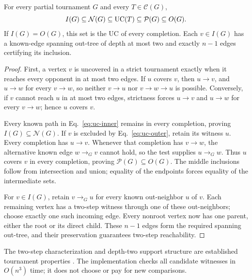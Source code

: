 \begin{proposition}\label{prop:uc-completion-enclosure}
For every partial tournament $G$ and every $T\in\mathcal C(G)$,
\[
I(G)\subseteq\mathcal N(G)\subseteq\mathrm{UC}(T)\subseteq\mathcal P(G)\subseteq O(G).
\]
If $I(G)=O(G)$, this set is the UC of every completion. Each $v\in I(G)$ has a known-edge spanning out-tree of depth at most two and exactly $n-1$ edges certifying its inclusion.
\end{proposition}
\begin{proof}
First, a vertex $v$ is uncovered in a strict tournament exactly when it reaches every opponent in at most two edges. If $u$ covers $v$, then $u\to v$, and $u\to w$ for every $v\to w$, so neither $v\to u$ nor $v\to w\to u$ is possible. Conversely, if $v$ cannot reach $u$ in at most two edges, strictness forces $u\to v$ and $u\to w$ for every $v\to w$; hence $u$ covers $v$.

Every known path in Eq.~\eqref{eq:uc-inner} remains in every completion, proving $I(G)\subseteq\mathcal N(G)$. If $v$ is excluded by Eq.~\eqref{eq:uc-outer}, retain its witness $u$. Every completion has $u\to v$. Whenever that completion has $v\to w$, the alternative known edge $w\to_Gv$ cannot hold, so the test supplies $u\to_Gw$. Thus $u$ covers $v$ in every completion, proving $\mathcal P(G)\subseteq O(G)$. The middle inclusions follow from intersection and union; equality of the endpoints forces equality of the intermediate sets.

For $v\in I(G)$, retain $v\to_Gu$ for every known out-neighbor $u$ of $v$. Each remaining vertex has a two-step witness through one of these out-neighbors; choose exactly one such incoming edge. Every nonroot vertex now has one parent, either the root or its direct child. These $n-1$ edges form the required spanning out-tree, and their preservation guarantees two-step reachability.
\end{proof}
The two-step characterization and depth-two support structure are established tournament properties \citep{aziz2015partial,contet2026supports}. The implementation checks all candidate witnesses in $O(n^3)$ time; it does not choose or pay for new comparisons.

